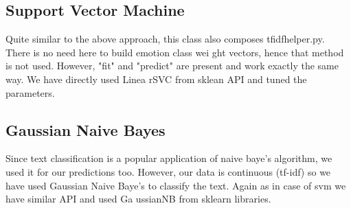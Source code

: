 \subsection{Support Vector Machine}
Quite similar to the above approach, this class also composes tfidfhelper.py. There is no need here to build emotion class wei
ght vectors, hence that method is not used. However, "fit" and "predict" are present and work exactly the same way. We have directly used Linea
rSVC from sklean API and tuned the parameters.

\subsection{Gaussian Naive Bayes}
Since text classification is a popular application of naive baye's algorithm, we used it for our predictions too. However, our 
data is continuous (tf-idf) so we have used Gaussian Naive Baye's to classify the text. Again as in case of svm we have similar API and used Ga
ussianNB from sklearn libraries.

